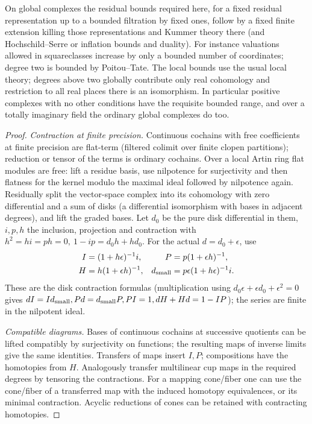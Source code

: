 On global complexes the residual bounds required here, for a fixed residual representation up to a bounded filtration by fixed ones, follow by a fixed finite extension killing those representations and Kummer theory there (and Hochschild--Serre or inflation bounds and duality). For instance valuations allowed in squareclasses increase by only a bounded number of coordinates; degree two is bounded by Poitou--Tate. The local bounds use the usual local theory; degrees above two globally contribute only real cohomology and restriction to all real places there is an isomorphism. In particular positive complexes with no other conditions have the requisite bounded range, and over a totally imaginary field the ordinary global complexes do too.

\begin{proof}
\emph{Contraction at finite precision.}
Continuous cochains with free coefficients at finite precision are flat-term (filtered colimit over finite clopen partitions); reduction or tensor of the terms is ordinary cochains. Over a local Artin ring flat modules are free: lift a residue basis, use nilpotence for surjectivity and then flatness for the kernel modulo the maximal ideal followed by nilpotence again. Residually split the vector-space complex into its cohomology with zero differential and a sum of disks (a differential isomorphism with bases in adjacent degrees), and lift the graded bases. Let \(d_0\) be the pure disk differential in them, \(i,p,h\) the inclusion, projection and contraction with \(h^2=hi=ph=0,\ 1-ip=d_0h+hd_0\). For the actual \(d=d_0+\epsilon\), use
\[
 \begin{aligned}
 I&=(1+h\epsilon)^{-1}i,& P&=p(1+\epsilon h)^{-1},\\
 H&=h(1+\epsilon h)^{-1},& d_{\rm small}&=p\epsilon(1+h\epsilon)^{-1}i.
 \end{aligned}
\]
These are the disk contraction formulas (multiplication using \(d_0\epsilon+\epsilon d_0+\epsilon^2=0\) gives \(dI=I d_{\rm small}, P d=d_{\rm small}P, PI=1, dH+Hd=1-IP\)); the series are finite in the nilpotent ideal. 

\emph{Compatible diagrams.}
Bases of continuous cochains at successive quotients can be lifted compatibly by surjectivity on functions; the resulting maps of inverse limits give the same identities. Transfers of maps insert \(I,P\); compositions have the homotopies from \(H\). Analogously transfer multilinear cup maps in the required degrees by tensoring the contractions. For a mapping cone/fiber one can use the cone/fiber of a transferred map with the induced homotopy equivalences, or its minimal contraction. Acyclic reductions of cones can be retained with contracting homotopies.


\end{proof}
